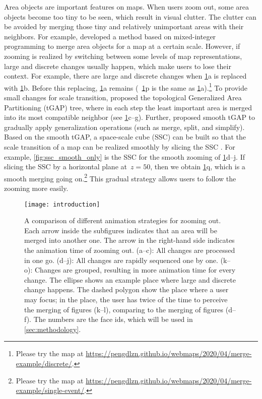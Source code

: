 \documentclass[ijgi,article,submit,moreauthors,pdftex]{Definitions/mdpi}
\begin{document}
Area objects are important features on maps. 
When users zoom out,
some area objects become too tiny to be seen,
which result in visual clutter.
The clutter can be avoided by merging 
those tiny and relatively unimportant areas with their neighbors.
For example, \citet{haunert2008f} developed a method based on
mixed-integer programming to merge area objects
for a map at a certain scale.
However, if zooming is realized by switching between
some levels of map representations, 
large and discrete changes usually happen, 
which make users to lose their context.
For example, there are large and discrete changes when
\fig\ref{fig:intro}a is replaced with \fig\ref{fig:intro}b.
Before this replacing, \fig\ref{fig:intro}a remains
(\eg~\fig\ref{fig:intro}p is the same as \fig\ref{fig:intro}a).\footnote{%
Please try the map at
\url{https://pengdlzn.github.io/webmaps/2020/04/merge-example/discrete/}.}
To provide small changes for scale transition, 
\citet{vanOosterom2005} proposed 
the topological Generalized Area Partitioning (tGAP) tree,
where in each step the least important area is merged into
its most compatible neighbor 
(see \figs\ref{fig:intro}c--g).
Further, \citet{vanOosterom2014Support} proposed smooth tGAP
to gradually apply generalization operations 
(such as merge, split, and simplify).
Based on the smooth tGAP, a space-scale cube (SSC) can be built so that 
the scale transition of a map can be realized smoothly
by slicing the SSC \citep[see][]{Meijers2020Web}.
For example, \fig\ref{fig:ssc_smooth_only} is the SSC 
for the smooth zooming of \figs\ref{fig:intro}d--j.
If slicing the SSC by a horizontal plane at~$z=50$,
then we obtain \fig\ref{fig:intro}q, 
which is a smooth merging going on.\footnote{%
Please try the map at
\url{https://pengdlzn.github.io/webmaps/2020/04/merge-example/single-event/}.}
This gradual strategy allows users 
to follow the zooming more easily.


\begin{figure}[tb]
\centering
\texttt{[image: introduction]}
\caption{A comparison of different animation strategies for zooming out.
Each arrow inside the subfigures indicates that 
an area will be merged into another one.
The arrow in the right-hand side indicates the animation time of zooming out.
%
(a--c): All changes are processed in one go.
(d--j): All changes are rapidly sequenced one by one.
(k--o): Changes are grouped, resulting in more animation time for every change.
%
The ellipse shows an example place where large and discrete change happens.
The dashed polygon show the place where a user may focus;
in the place, the user has twice of the time to perceive the merging
of figures (k--l),
comparing to the merging of figures (d--f).
The numbers are the face ids, which will be used in \sect\ref{sec:methodology}.
}
\label{fig:intro}
\end{figure}
\end{document}
